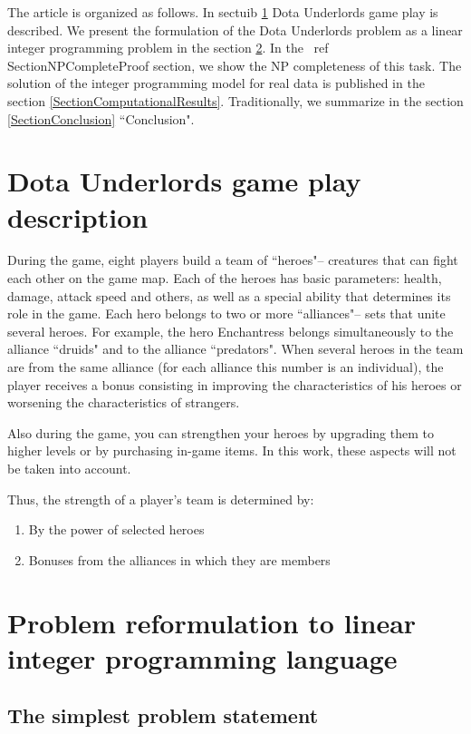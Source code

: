\documentclass{article}
\begin{document}
The article is organized as follows. In sectuib \ref{SectionDUDescription} Dota Underlords game play is described.
We present the formulation of the Dota Underlords problem as a linear integer programming problem in the section \ref{SectionDUIP}. In the \ ref {SectionNPCompleteProof} section, we show the NP completeness of this task. The solution of the integer programming model for real data is published in the section \ref{SectionComputationalResults}. Traditionally, we summarize in the section \ref{SectionConclusion} ``Conclusion".

\section{Dota Underlords game play description}
\label{SectionDUDescription}

During the game, eight players build a team of ``heroes"-- creatures that can fight each other on the game map. Each of the heroes has basic parameters: health, damage, attack speed and others, as well as a special ability that determines its role in the game. Each hero belongs to two or more ``alliances"-- sets that unite several heroes. For example, the hero Enchantress belongs simultaneously to the alliance ``druids" and to the alliance ``predators". When  several heroes in the team are from the same alliance (for each alliance this number is an individual), the player receives a bonus consisting in improving the characteristics of his heroes or worsening the characteristics of strangers.

Also during the game, you can strengthen your heroes by upgrading them to higher levels or by purchasing in-game items. In this work, these aspects will not be taken into account.

Thus, the strength of a player’s team is determined by:

\begin{enumerate}
    \item By the power of selected heroes
    \item Bonuses from the alliances in which they are members
\end{enumerate}


\section{Problem reformulation to linear integer programming language }
\label{SectionDUIP}

\subsection{The simplest problem statement}
\end{document}
